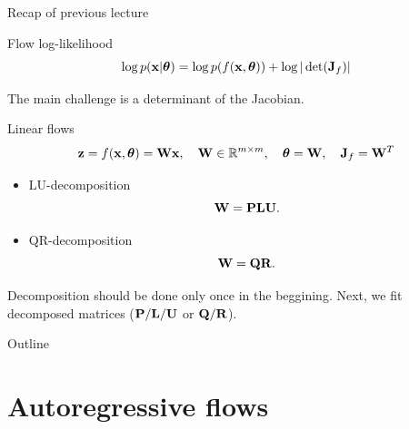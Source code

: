 \begin{frame}{Recap of previous lecture}
	\vspace{-0.5cm}
	\begin{block}{Flow log-likelihood}
		\vspace{-0.3cm}
		\[
			\log p(\mathbf{x}|\boldsymbol{\theta}) = \log p(f(\mathbf{x}, \boldsymbol{\theta})) + \log  |\det (\mathbf{J}_f)|
		\]
		\vspace{-0.5cm}
	\end{block}
	The main challenge is a determinant of the Jacobian.
	\begin{block}{Linear flows}	
		\vspace{-0.2cm}
		\[
			\mathbf{z} = f(\mathbf{x}, \boldsymbol{\theta}) = \mathbf{W} \mathbf{x}, \quad \mathbf{W} \in \mathbb{R}^{m \times m}, \quad \boldsymbol{\theta} = \mathbf{W}, \quad \mathbf{J}_f = \mathbf{W}^T
		\]
	\end{block}
	\vspace{-0.3cm}
	\begin{itemize}
		\item LU-decomposition
		\[
			\mathbf{W} = \mathbf{P} \mathbf{L} \mathbf{U}.
		\]
		\item QR-decomposition
		\[
			\mathbf{W} = \mathbf{Q} \mathbf{R}.
		\]
	\end{itemize}
	Decomposition should be done only once in the beggining. Next, we fit decomposed matrices ($\mathbf{P}/\mathbf{L}/\mathbf{U}$ or $\mathbf{Q}/\mathbf{R}$).
\end{frame}
\begin{frame}{Outline}
	\tableofcontents
\end{frame}
\section{Autoregressive flows}
